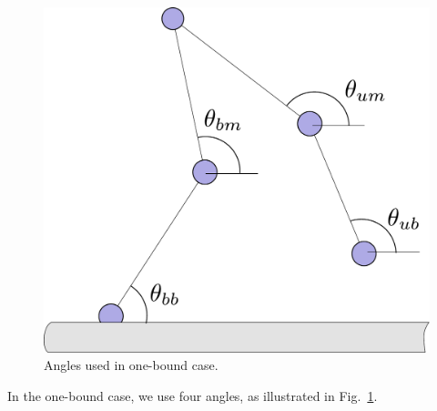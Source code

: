 \documentclass[11pt,twocolumn]{article}
\begin{document}
\begin{figure}
  \includegraphics[width=\columnwidth]{../figures/code-onebound}
  \caption{Angles used in one-bound case.}\label{fig:onebound}
\end{figure}

In the one-bound case, we use four angles, as illustrated in
Fig.~\ref{fig:onebound}.
\end{document}
